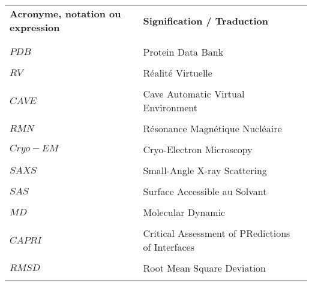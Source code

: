 

\begin{table}[htbp]
\centering
\begin{tabular}{l l l}

\textbf{Acronyme, notation ou expression} & \textbf{Signification / Traduction} & \\ \\ %
\hline
\\
$PDB$ & Protein Data Bank & \\  \\
$RV$ & Réalité Virtuelle & \\  \\
$CAVE$ & Cave Automatic Virtual Environment & \\  \\
$RMN$ & Résonance Magnétique Nucléaire & \\  \\
$Cryo-EM$ & Cryo-Electron Microscopy & \\  \\
$SAXS$ & Small-Angle X-ray Scattering & \\  \\
$SAS$ & Surface Accessible au Solvant & \\  \\
$MD$ & Molecular Dynamic & \\  \\
$CAPRI$ & Critical Assessment of PRedictions of Interfaces & \\  \\
$RMSD$ & Root Mean Square Deviation & \\  \\

\end{tabular}
\end{table}
